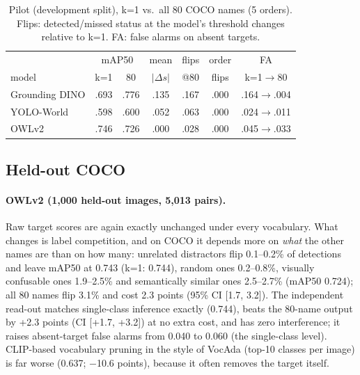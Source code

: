 \documentclass[10pt,twocolumn,letterpaper]{article}
\begin{document}
\begin{table}[t]\centering\small\setlength{\tabcolsep}{3pt}
\caption{Pilot (development split), k=1 vs.\ all 80 COCO names (5 orders). Flips: detected/missed status at the
model's threshold changes relative to k=1. FA: false alarms on absent targets.}\label{tab:pilot}
\begin{tabular}{lcccccc}\toprule
 & \multicolumn{2}{c}{mAP50} & mean & flips & order & FA \\
model & k=1 & 80 & $|\Delta s|$ & @80 & flips & k=1$\to$80\\\midrule
Grounding DINO & .693 & .776 & .135 & .167 & .000 & .164$\to$.004\\
YOLO-World & .598 & .600 & .052 & .063 & .000 & .024$\to$.011\\
OWLv2 & .746 & .726 & .000 & .028 & .000 & .045$\to$.033\\\bottomrule
\end{tabular}\end{table}

\subsection{Held-out COCO}
\paragraph{OWLv2 (1{,}000 held-out images, 5{,}013 pairs).} Raw target scores are again exactly unchanged under every
vocabulary. What changes is label competition, and on COCO it depends more on \emph{what} the other names are than on how many:
unrelated distractors flip 0.1--0.2\% of detections and leave mAP50 at 0.743 (k=1: 0.744), random ones 0.2--0.8\%,
visually confusable ones 1.9--2.5\% and semantically similar ones 2.5--2.7\% (mAP50 0.724); all 80 names flip 3.1\% and
cost 2.3 points (95\% CI [1.7, 3.2]). The independent read-out matches single-class inference exactly (0.744), beats the
80-name output by +2.3 points (CI [+1.7, +3.2]) at no extra cost, and has zero interference; it raises absent-target false alarms from 0.040 to 0.060 (the single-class level). CLIP-based vocabulary
pruning in the style of VocAda (top-10 classes per image) is far worse (0.637; $-$10.6 points), because it often
removes the target itself.
\end{document}
